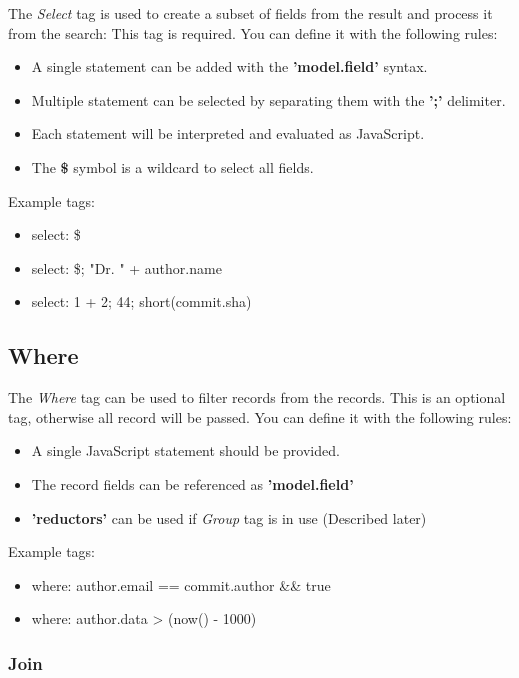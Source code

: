 The \textit{Select} tag is used to create a subset of fields from the result and process it from the search:
This tag is required.
You can define it with the following rules:

\begin{itemize}
	\item A single statement can be added with the \textbf{'{model}.{field}'} syntax.
	\item Multiple statement can be selected by separating them with the \textbf{';'} delimiter.
	\item Each statement will be interpreted and evaluated as JavaScript.
	\item The \textbf{\$} symbol is a wildcard to select all fields. 
\end{itemize}

Example tags:
\begin{itemize}
	\item select: \$
	\item select: \$; "Dr. " + author.name
	\item select: 1 + 2; 44; short(commit.sha)
\end{itemize}

\subsection{Where}

The \textit{Where} tag can be used to filter records from the records.
This is an optional tag, otherwise all record will be passed.
You can define it with the following rules:

\begin{itemize}
	\item A single JavaScript statement should be provided.
	\item The record fields can be referenced as \textbf{'{model}.{field}'}
	\item \textbf{'reductors'} can be used if \textit{Group} tag is in use (Described later)
\end{itemize}

Example tags:
\begin{itemize}
	\item where: author.email == commit.author \&\& true
	\item where: author.data > (now() - 1000)
\end{itemize}

\subsubsection{Join}

